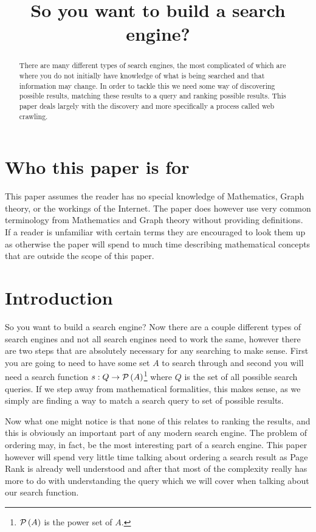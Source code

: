 \documentclass{article}
\title{So you want to build a search engine?}
\begin{document}
	\maketitle
	
	\tableofcontents
	
	\begin{abstract}
		There are many different types of search engines, the most complicated of which are where you do not initially have knowledge of what is being searched and that information may change. In order to tackle this we need some way of discovering possible results, matching these results to a query and ranking possible results. This paper deals largely with the discovery and more specifically a process called web crawling.
	\end{abstract}
	
	\section{Who this paper is for}
	This paper assumes the reader has no special knowledge of Mathematics, Graph theory, or the workings of the Internet. The paper does however use very common terminology from Mathematics and Graph theory without providing definitions. If a reader is unfamiliar with certain terms they are encouraged to look them up as otherwise the paper will spend to much time describing mathematical concepts that are outside the scope of this paper.
	
	\section{Introduction}
	So you want to build a search engine? Now there are a couple different types of search engines and not all search engines need to work the same, however there are two steps that are absolutely necessary for any searching to make sense. First you are going to need to have some set $A$ to search through and second you will need a search function $s:Q\to\mathcal P\left( {A} \right)$\footnote{$\mathcal P\left( {A} \right)$ is the power set of $A$.} where $Q$ is the set of all possible search queries. If we step away from mathematical formalities, this makes sense, as we simply are finding a way to match a search query to set of possible results.
	
	Now what one might notice is that none of this relates to ranking the results, and this is obviously an important part of any modern search engine. The problem of ordering may, in fact, be the most interesting part of a search engine. This paper however will spend very little time talking about ordering a search result as Page Rank is already well understood and after that most of the complexity really has more to do with understanding the query which we will cover when talking about our search function.
	
\end{document}
